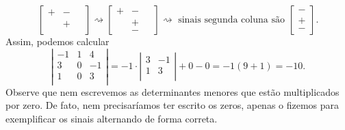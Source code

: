 \begin{ex}
\begin{equation}
\begin{bmatrix}
+ & - & \,\,  \\
& + & \,\,  \\
\,\,& \,\, &  \,\,
\end{bmatrix} \rightsquigarrow
\begin{bmatrix}
+ & - &  \,\, \\
\,\,& + &  \,\, \\
\,\,& - &  \,\,
\end{bmatrix}\rightsquigarrow \text{ sinais segunda coluna são }
\begin{bmatrix}
- \\ + \\ -
\end{bmatrix}.
\end{equation} Assim, podemos calcular
\begin{equation}
\left|
\begin{matrix}
-1 & 1 & 4 \\
3 & 0 & -1 \\
1 & 0 & 3 \\
\end{matrix}
\right| = -1 \cdot
\left|
\begin{matrix}
3  & -1 \\
1  & 3 \\
\end{matrix}
\right| + 0 - 0 = -1 (9 + 1) = -10.
\end{equation} Observe que nem escrevemos as determinantes menores que estão multiplicados por zero. De fato, nem precisaríamos ter escrito os zeros, apenas o fizemos para exemplificar os sinais alternando de forma correta.


\end{ex}
